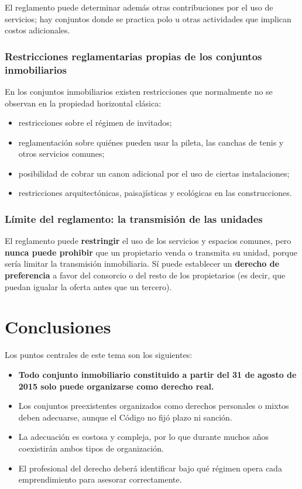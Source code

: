 \documentclass[12pt,oneside]{book}
\begin{document}
El reglamento puede determinar además otras contribuciones por el uso de servicios; hay conjuntos donde se practica polo u otras actividades que implican costos adicionales.

\subsection{Restricciones reglamentarias propias de los conjuntos inmobiliarios}

En los conjuntos inmobiliarios existen restricciones que normalmente no se observan en la propiedad horizontal clásica:

\begin{itemize}
    \item restricciones sobre el régimen de invitados;
    \item reglamentación sobre quiénes pueden usar la pileta, las canchas de tenis y otros servicios comunes;
    \item posibilidad de cobrar un canon adicional por el uso de ciertas instalaciones;
    \item restricciones arquitectónicas, paisajísticas y ecológicas en las construcciones.
\end{itemize}

\subsection{Límite del reglamento: la transmisión de las unidades}

\begin{important}
El reglamento puede \textbf{restringir} el uso de los servicios y espacios comunes, pero \textbf{nunca puede prohibir} que un propietario venda o transmita su unidad, porque sería limitar la transmisión inmobiliaria. Sí puede establecer un \textbf{derecho de preferencia} a favor del consorcio o del resto de los propietarios (es decir, que puedan igualar la oferta antes que un tercero).
\end{important}

\chapter[Conclusiones]{Conclusiones}

Los puntos centrales de este tema son los siguientes:

\begin{itemize}
    \item \textbf{Todo conjunto inmobiliario constituido a partir del 31 de agosto de 2015 solo puede organizarse como derecho real.}
    \item Los conjuntos preexistentes organizados como derechos personales o mixtos deben adecuarse, aunque el Código no fijó plazo ni sanción.
    \item La adecuación es costosa y compleja, por lo que durante muchos años coexistirán ambos tipos de organización.
    \item El profesional del derecho deberá identificar bajo qué régimen opera cada emprendimiento para asesorar correctamente.
\end{itemize}
\end{document}
